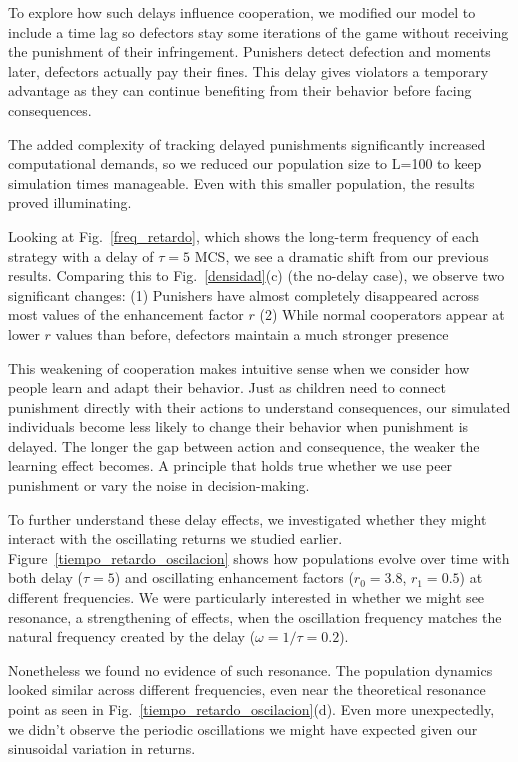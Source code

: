 To explore how such delays influence cooperation, we modified our model to include a time lag so defectors stay some iterations of the game without receiving the punishment of their infringement.  Punishers detect defection and moments later, defectors actually pay their fines. This delay gives violators a temporary advantage as they can continue benefiting from their behavior before facing consequences.

The added complexity of tracking delayed punishments significantly increased computational demands, so we reduced our population size to L=100 to keep simulation times manageable. Even with this smaller population, the results proved illuminating.

Looking at Fig.~\ref{freq_retardo}, which shows the long-term frequency of each strategy with a delay of $\tau=5$ MCS, we see a dramatic shift from our previous results. Comparing this to Fig.~\ref{densidad}(c) (the no-delay case), we observe two significant changes: (1) Punishers have almost completely disappeared across most values of the enhancement factor $r$ (2) While normal cooperators appear at lower $r$ values than before, defectors maintain a much stronger presence

This weakening of cooperation makes intuitive sense when we consider how people learn and adapt their behavior. Just as children need to connect punishment directly with their actions to understand consequences, our simulated individuals become less likely to change their behavior when punishment is delayed. The longer the gap between action and consequence, the weaker the learning effect becomes. A principle that holds true whether we use peer punishment or vary the noise in decision-making.

To further understand these delay effects, we investigated whether they might interact with the oscillating returns we studied earlier. Figure~\ref{tiempo_retardo_oscilacion} shows how populations evolve over time with both delay ($\tau=5$) and oscillating enhancement factors ($r_0=3.8$, $r_1=0.5$) at different frequencies. We were particularly interested in whether we might see resonance, a strengthening of effects, when the oscillation frequency matches the natural frequency created by the delay ($\omega=1/\tau=0.2$).

Nonetheless we found no evidence of such resonance. The population dynamics looked similar across different frequencies, even near the theoretical resonance point as seen in Fig.~\ref{tiempo_retardo_oscilacion}(d). Even more unexpectedly, we didn't observe the periodic oscillations we might have expected given our sinusoidal variation in returns.

